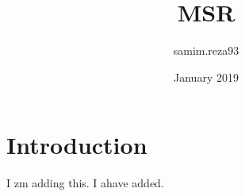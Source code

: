 \documentclass{article}
\title{MSR}
\author{samim.reza93 }
\date{January 2019}
\begin{document}
\maketitle

\section{Introduction}
I zm adding this.
I ahave added.
\end{document}
